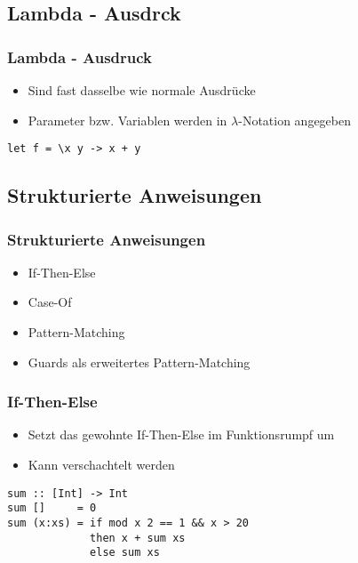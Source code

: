 \subsection{Lambda - Ausdrck}
\begin{frame}[fragile]
\frametitle{Lambda - Ausdruck}
\begin{block}{\vspace*{-3ex}}
\begin{itemize}
  \item Sind fast dasselbe wie normale Ausdrücke
  \item Parameter bzw. Variablen werden in $\lambda$-Notation angegeben
\end{itemize}
\end{block}
\begin{lstlisting}
let f = \x y -> x + y
\end{lstlisting}
\end{frame}

\subsection{Strukturierte Anweisungen}
\begin{frame}
\frametitle{Strukturierte Anweisungen}
\begin{block}{\vspace*{-3ex}}
\begin{itemize}
  \item If-Then-Else
  \item Case-Of
  \item Pattern-Matching
  \item Guards als erweitertes Pattern-Matching
\end{itemize}
\end{block}
\end{frame}

\begin{frame}[fragile]
\frametitle{If-Then-Else}
\begin{block}{\vspace*{-3ex}}
\begin{itemize}
  \item Setzt das gewohnte If-Then-Else im Funktionsrumpf um
  \item Kann verschachtelt werden
\end{itemize}
\begin{center}
\scalebox{0.7}{}
\end{center}
\end{block}
\begin{lstlisting}
sum :: [Int] -> Int
sum []     = 0
sum (x:xs) = if mod x 2 == 1 && x > 20 
             then x + sum xs
             else sum xs
\end{lstlisting}
\end{frame}

